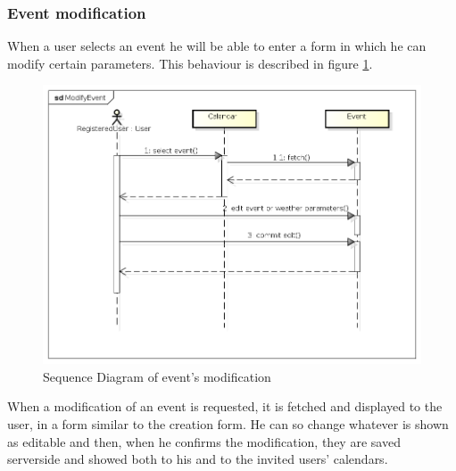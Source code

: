 \subsubsection{Event modification}
When a user selects an event he will be able to enter a form in which he can modify certain parameters. This behaviour is described in figure \ref{fig:modseqdiag}.
\begin{center}
 \begin{figure}[H]
    \includegraphics[width=1\textwidth]{./UMLDiagram/sequence/ModifyEvent/ModifyEvent.png}
    \caption{Sequence Diagram of event's modification}
     \label{fig:modseqdiag}
     \end{figure}
   \end{center}
When a modification of an event is requested, it is fetched and displayed to the user, in a form similar to the creation form. He can so change whatever is shown as editable and then, when he confirms the modification, they are saved serverside and showed both to his and to the invited users' calendars.
